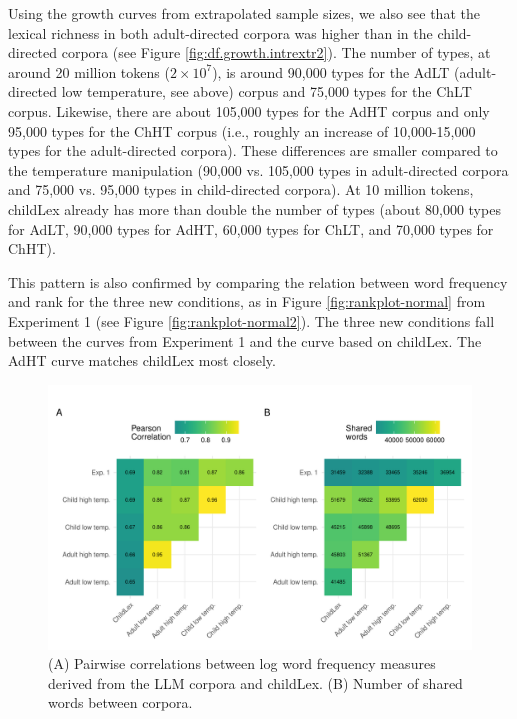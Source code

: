 \documentclass[doc, a4paper, anonymous]{apa7}
\begin{document}
Using the growth curves from extrapolated sample sizes, we also see that the lexical richness in both adult-directed corpora was higher than in the child-directed corpora (see Figure \ref{fig:df.growth.intrextr2}). The number of types, at around 20 million tokens ($2 \times 10^7$), is around 90,000 types for the AdLT (adult-directed low temperature, see above) corpus and 75,000 types for the ChLT corpus. Likewise, there are about 105,000 types for the AdHT corpus and only 95,000 types for the ChHT corpus (i.e., roughly an increase of 10,000-15,000 types for the adult-directed corpora). These differences are smaller compared to the temperature manipulation (90,000 vs. 105,000 types in adult-directed corpora and 75,000 vs. 95,000 types in child-directed corpora). At 10 million tokens, childLex already has more than double the number of types (about 80,000 types for AdLT, 90,000 types for AdHT, 60,000 types for ChLT, and 70,000 types for ChHT). 

This pattern is also confirmed by comparing the relation between word frequency and rank for the three new conditions, as in Figure \ref{fig:rankplot-normal} from Experiment 1 (see Figure \ref{fig:rankplot-normal2}). The three new conditions fall between the curves from Experiment 1 and the curve based on childLex. The AdHT curve matches childLex most closely. 

\begin{figure}[!htbp]
  \centerline{
    \includegraphics[width=1.1\textwidth]{figures/combined_plotc.pdf}}
    \caption{(A) Pairwise correlations between log word frequency measures derived from the LLM corpora and childLex. (B) Number of shared words between corpora.}
    \label{fig:combined_plotc}
\end{figure}
\end{document}
